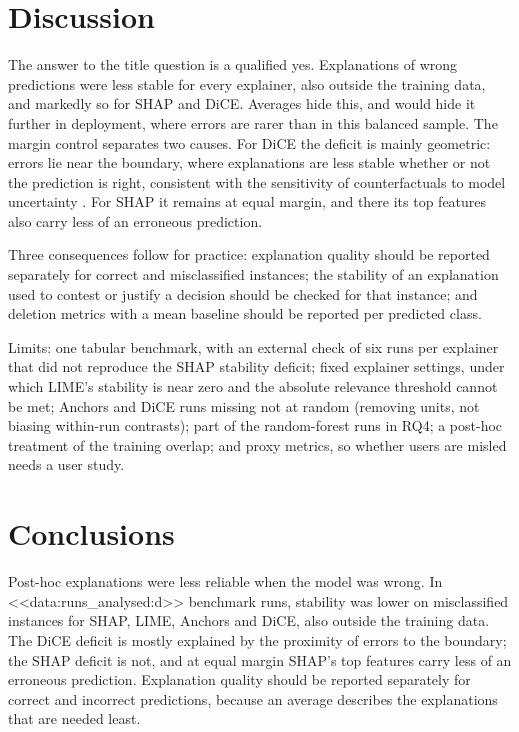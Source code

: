 \documentclass[12pt,letterpaper]{article}
\begin{document}
\section{Discussion}

The answer to the title question is a qualified yes. Explanations of wrong predictions
were less stable for every explainer, also outside the training data, and markedly so for
SHAP and DiCE. Averages hide this, and would hide it further in deployment, where errors
are rarer than in this balanced sample. The margin control separates two causes. For DiCE
the deficit is mainly geometric: errors lie near the boundary, where explanations are less
stable whether or not the prediction is right, consistent with the sensitivity of
counterfactuals to model uncertainty \cite{christodoulou2026impact}. For SHAP it remains at
equal margin, and there its top features also carry less of an erroneous prediction.

Three consequences follow for practice: explanation quality should be reported
separately for correct and misclassified instances; the stability of an explanation used
to contest or justify a decision should be checked for that instance; and deletion
metrics with a mean baseline should be reported per predicted class.

Limits: one tabular benchmark, with an external check of six runs per explainer that
did not reproduce the SHAP stability deficit; fixed explainer settings, under which LIME's
stability is near zero and the absolute relevance threshold cannot be met; Anchors and DiCE
runs missing not at random (removing units, not biasing within-run contrasts); part of the
random-forest runs in RQ4; a post-hoc treatment of the training overlap; and proxy metrics,
so whether users are misled needs a user study.

\section{Conclusions}

Post-hoc explanations were less reliable when the model was wrong. In
<<data:runs_analysed:d>> benchmark runs, stability was lower on misclassified instances for
SHAP, LIME, Anchors and DiCE, also outside the training data. The DiCE deficit is mostly
explained by the proximity of errors to the boundary; the SHAP deficit is not, and at equal
margin SHAP's top features carry less of an erroneous prediction. Explanation quality
should be reported separately for correct and incorrect predictions, because an average
describes the explanations that are needed least.
\end{document}
